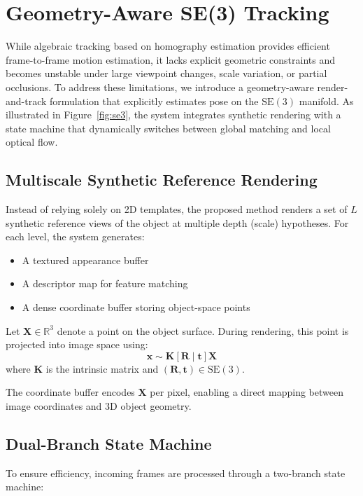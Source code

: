 \section{Geometry-Aware SE(3) Tracking}



While algebraic tracking based on homography estimation provides efficient frame-to-frame motion estimation, it lacks explicit geometric constraints and becomes unstable under large viewpoint changes, scale variation, or partial occlusions. To address these limitations, we introduce a geometry-aware render-and-track formulation that explicitly estimates pose on the $\mathrm{SE}(3)$ manifold. As illustrated in Figure~\ref{fig:se3}, the system integrates synthetic rendering with a state machine that dynamically switches between global matching and local optical flow.

\subsection{Multiscale Synthetic Reference Rendering}

Instead of relying solely on 2D templates, the proposed method renders a set of $L$ synthetic reference views of the object at multiple depth (scale) hypotheses. For each level, the system generates:
\begin{itemize}
    \item A textured appearance buffer
    \item A descriptor map for feature matching
    \item A dense coordinate buffer storing object-space points
\end{itemize}

Let $\mathbf{X} \in \mathbb{R}^3$ denote a point on the object surface. During rendering, this point is projected into image space using:
\[
\mathbf{x} \sim \mathbf{K} [\mathbf{R} \mid \mathbf{t}] \mathbf{X}
\]
where $\mathbf{K}$ is the intrinsic matrix and $(\mathbf{R}, \mathbf{t}) \in \mathrm{SE}(3)$.

The coordinate buffer encodes $\mathbf{X}$ per pixel, enabling a direct mapping between image coordinates and 3D object geometry.

\subsection{Dual-Branch State Machine}

To ensure efficiency, incoming frames are processed through a two-branch state machine:

